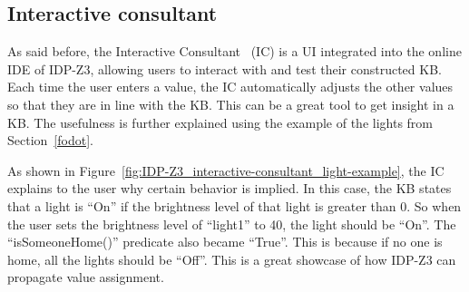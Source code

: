 \documentclass[11pt,a4paper]{report}
\newcommand{\fodot}{FO($\cdot$)\xspace}
\begin{document}

\subsection{Interactive consultant}
\label{interactive_consultant}
As said before, the Interactive Consultant~\cite{InteractiveConsultant} (IC) is a UI integrated into the online IDE of IDP-Z3, allowing users to interact with and test their constructed KB. Each time the user enters a value, the IC automatically adjusts the other values so that they are in line with the KB. This can be a great tool to get insight in a KB. The usefulness is further explained using the example of the lights from Section~\ref{fodot}.

As shown in Figure~\ref{fig:IDP-Z3_interactive-consultant_light-example}, the IC explains to the user why certain behavior is implied. In this case, the KB states that a light is ``On'' if the brightness level of that light is greater than 0. So when the user sets the brightness level of ``light1'' to 40, the light should be ``On''. The ``isSomeoneHome()'' predicate also became ``True''. This is because if no one is home, all the lights should be ``Off''. This is a great showcase of how IDP-Z3 can propagate value assignment.
\end{document}
